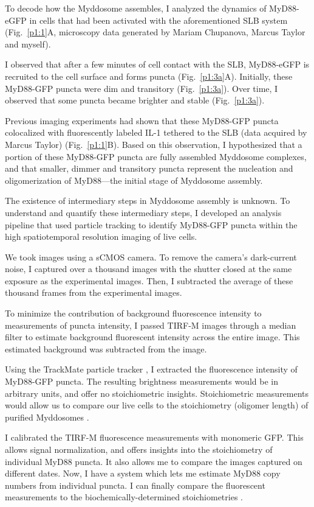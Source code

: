 To decode how the Myddosome assembles, I analyzed the dynamics of MyD88-eGFP in cells that had been activated with the aforementioned SLB system (Fig.~\ref{p1:1}A, microscopy data generated by Mariam Chupanova, Marcus Taylor and myself).

I observed that after a few minutes of cell contact with the SLB, MyD88-eGFP is recruited to the cell surface and forms puncta (Fig.~\ref{p1:3a}A). Initially, these MyD88-GFP puncta were dim and transitory (Fig.~\ref{p1:3a}). Over time, I observed that some puncta became brighter and stable (Fig.~\ref{p1:3a}).

Previous imaging experiments had shown that these MyD88-GFP puncta colocalized with fluorescently labeled IL-1 tethered to the SLB (data acquired by Marcus Taylor) (Fig.~\ref{p1:1}B). Based on this observation, I hypothesized that a portion of these MyD88-GFP puncta are fully assembled Myddosome complexes, and that smaller, dimmer and transitory puncta represent the nucleation and oligomerization of MyD88---the initial stage of Myddosome assembly.

The existence of intermediary steps in Myddosome assembly is unknown. To understand and quantify these intermediary steps, I developed an analysis pipeline that used particle tracking to identify MyD88-GFP puncta within the high spatiotemporal resolution imaging of live cells.

We took images using a sCMOS camera. To remove the camera’s dark-current noise, I captured over a thousand images with the shutter closed at the same exposure as the experimental images. Then, I subtracted the average of these thousand frames from the experimental images.

To minimize the contribution of background fluorescence intensity to measurements of puncta intensity, I passed TIRF-M images through a median filter to estimate background fluorescent intensity across the entire image. This estimated background was subtracted from the image.

Using the TrackMate particle tracker \autocite{Tinevez_2017}, I extracted the fluorescence intensity of MyD88-GFP puncta. The resulting brightness measurements would be in arbitrary units, and offer no stoichiometric insights. Stoichiometric measurements would allow us to compare our live cells to the stoichiometry (oligomer length) of purified Myddosomes \autocite{Lin_2010}.

I calibrated the TIRF-M fluorescence measurements with monomeric GFP. This allows signal normalization, and offers insights into the stoichiometry of individual MyD88 puncta. It also allows me to compare the images captured on different dates. Now, I have a system which lets me estimate MyD88 copy numbers from individual puncta. I can finally compare the fluorescent measurements to the biochemically-determined stoichiometries \autocite{Lin_2010}\autocite{Moncrieffe_2020}.

